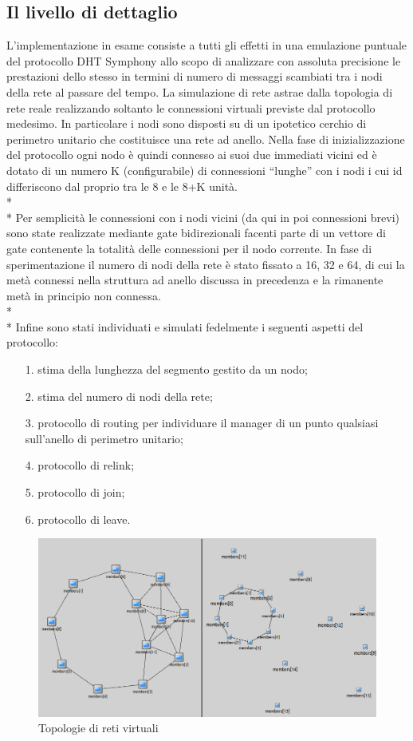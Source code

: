 \documentclass[	
	DIV=calc,
	paper=a4,
	fontsize=11pt,
	onecolumn
]{scrartcl} %
\begin{document}
	\subsection{Il livello di dettaglio}
	L'implementazione in esame consiste a tutti gli effetti in una emulazione puntuale del protocollo DHT Symphony allo scopo di analizzare con assoluta precisione le prestazioni dello stesso in termini di numero di messaggi scambiati tra i nodi della rete al passare del tempo. La simulazione di rete astrae dalla topologia di rete reale realizzando soltanto le connessioni virtuali previste dal protocollo medesimo. In particolare i nodi sono disposti su di un ipotetico cerchio di perimetro unitario che costituisce una rete ad anello. Nella fase di inizializzazione del protocollo ogni nodo è quindi connesso ai suoi due immediati vicini ed è dotato di un numero K (configurabile) di connessioni ``lunghe'' con i nodi i cui id differiscono dal proprio tra le 8 e le 8+K unità. \\*\\*
Per semplicità le connessioni con i nodi vicini (da qui in poi connessioni brevi) sono state realizzate mediante gate bidirezionali facenti parte di un vettore di gate contenente la totalità delle connessioni per il nodo corrente. In fase di sperimentazione il numero di nodi della rete è stato fissato a 16, 32 e 64, di cui la metà connessi nella struttura ad anello discussa in precedenza e la rimanente metà in principio non connessa.\\*\\* 
Infine sono stati individuati e simulati fedelmente i seguenti aspetti del protocollo:
	\begin{itemize}
		\item[1.] stima della lunghezza del segmento gestito da un nodo;
		\item[2.] stima del numero di nodi della rete;
		\item[3.] protocollo di routing per individuare il manager di un punto qualsiasi sull'anello di perimetro unitario;
		\item[4.] protocollo di relink;
		\item[5.] protocollo di join;
		\item[6.] protocollo di leave.		
	\end{itemize}

\begin{figure}
	\centering
	\includegraphics[scale=0.35]{topologia.png}
	\caption{Topologie di reti virtuali}
	\label{Figura 1}
\end{figure}
\end{document}
